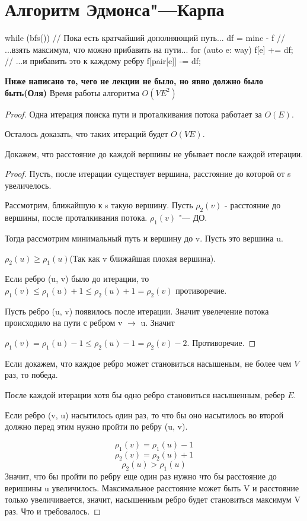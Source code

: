 \section{Алгоритм Эдмонса"---Карпа}

\begin{cppcode}
while (bfs()) {           // Пока есть кратчайший дополняющий путь...
	df = min{c - f}       // ...взять максимум, что можно прибавить на пути...
	for (auto e: way) {
		f[e] += df;       // ...и прибавить это к каждому ребру
		f[pair[e]] -= df;
	}
}
\end{cppcode}

\textbf{\Large Ниже написано то, чего не лекции не было, но явно должно было быть(Оля)}
Время работы алгоритма $O(VE^2)$
\begin{proof}
Одна итерация поиска пути и проталкивания потока работает за $O(E)$.

Осталось доказать, что таких итераций будет $O(VE)$.

Докажем, что расстояние до каждой вершины не убывает после каждой итерации. 
\begin{proof}
    Пусть, после итерации существует вершина, расстояние до которой от s увеличелось. 

    Рассмотрим, ближайшую к s такую вершину. Пусть $\rho_2(v)$ - расстояние до вершины, после
    проталкивания потока. $\rho_1(v)$ "--- ДО.

    Тогда рассмотрим минимальный путь и вершину до v. Пусть это вершина u.

    $\rho_2(u) \ge \rho_1(u)$(Так как v ближайшая плохая вершина).

    Если ребро (u, v) было до итерации, то $\rho_1(v) \le \rho_1(u) + 1 \le \rho_2(u) + 1 = \rho_2(v)$  противоречие.

    Пусть ребро (u, v) появилось после итерации. Значит увелечение потока происходило на пути 
    с ребром v $\to$ u. Значит
    
    $\rho_1(v) = \rho_1(u) - 1 \le \rho_2(u) - 1 = \rho_2(v) - 2$. Противоречие.
\end{proof}

    Если докажем, что каждое ребро может становиться насышеным, не более чем $V$ раз, то
    победа.
    
    После каждой итерации хотя бы одно ребро становиться насышенным, ребер $E$.

    Если ребро (v, u) насытилось один раз, то что бы оно насытилось во второй должно 
    перед этим нужно пройти по ребру (u, v).

    $$\rho_1(v) = \rho_1(u) - 1$$
    $$\rho_2(v) = \rho_2(u) + 1$$
    $$\rho_2(u) > \rho_1(u)$$
    Значит, что бы пройти по ребру еще один раз нужно что бы расстояние до веришины u увеличилось. 
    Максимальное расстояние может быть V и расстояние только увеличивается, значит, насышенным
    ребро будет становиться максимум V раз. Что и требовалось.  
\end{proof}


